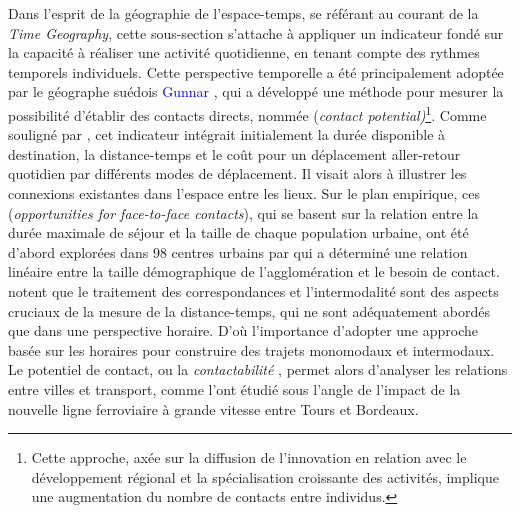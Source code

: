 \begin{refsegment}
Dans l'esprit de la géographie de l'espace-temps, se référant au courant de la \textsl{Time Geography}, cette sous-section s'attache à appliquer un indicateur fondé sur la capacité à réaliser une activité quotidienne, en tenant compte des rythmes temporels individuels. Cette perspective temporelle a été principalement adoptée par le géographe suédois \textcolor{blue}{Gunnar} \textcolor{blue}{\textcite{tornqvist_contact_1984}}, qui a développé une méthode pour mesurer la possibilité d'établir des contacts directs, nommée  (\textsl{contact potential)}\footnote{Cette approche, axée sur la diffusion de l'innovation en relation avec le développement régional et la spécialisation croissante des activités, implique une augmentation du nombre de contacts entre individus.}. Comme souligné par \textcolor{blue}{\textcite[9-11]{lhostis_contribution_2018}}, cet indicateur intégrait initialement la durée disponible à destination, la distance-temps et le coût pour un déplacement aller-retour quotidien par différents modes de déplacement. Il visait alors à illustrer les connexions existantes dans l'espace entre les lieux. Sur le plan empirique, ces  (\textsl{opportunities for face-to-face contacts}), qui se basent sur la relation entre la durée maximale de séjour et la taille de chaque population urbaine, ont été d'abord explorées dans 98 centres urbains par \textcolor{blue}{\textcite[13, 18]{tornqvist_contact_1984}} qui a déterminé une relation linéaire entre la taille démographique de l'agglomération et le besoin de contact. \textcolor{blue}{\textcite[12]{lhostis_contribution_2018}} notent que le traitement des correspondances et l'intermodalité sont des aspects cruciaux de la mesure de la distance-temps, qui ne sont adéquatement abordés que dans une perspective horaire. D'où l'importance d'adopter une approche basée sur les horaires pour construire des trajets monomodaux et intermodaux. Le potentiel de contact, ou la \textsl{contactabilité} \textcolor{blue}{\autocite[]{haggett_geography_2001}}, permet alors d'analyser les relations entre villes et transport, comme l'ont étudié \textcolor{blue}{\textcite[6]{lhostis_using_2017}} sous l'angle de l'impact de la nouvelle ligne ferroviaire à grande vitesse entre Tours et Bordeaux.%


\end{refsegment}
